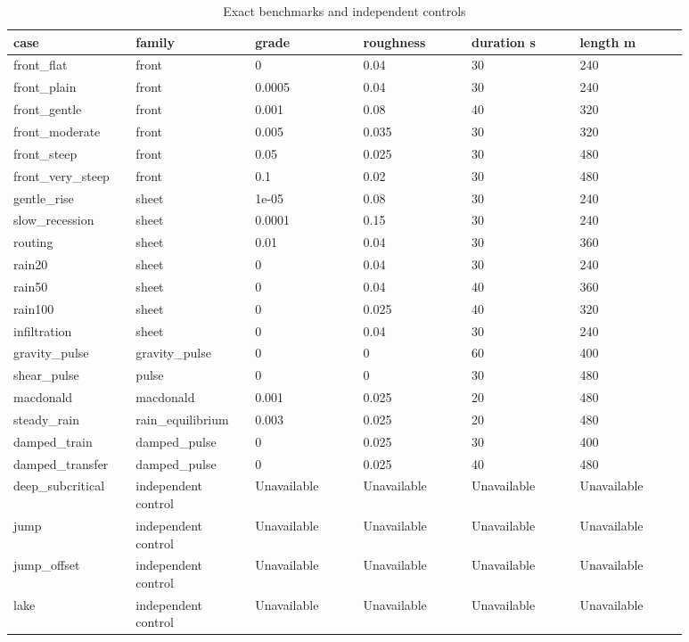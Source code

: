 \begingroup
\small
\setlength{\tabcolsep}{2pt}
\begin{longtable}{p{0.1467\linewidth}p{0.1467\linewidth}p{0.1467\linewidth}p{0.1467\linewidth}p{0.1467\linewidth}p{0.1467\linewidth}}
\caption{Exact benchmarks and independent controls}\\
\hline
case & family & grade & roughness & duration s & length m \\
\hline\endhead
front\_flat & front & 0 & 0.04 & 30 & 240 \\
front\_plain & front & 0.0005 & 0.04 & 30 & 240 \\
front\_gentle & front & 0.001 & 0.08 & 40 & 320 \\
front\_moderate & front & 0.005 & 0.035 & 30 & 320 \\
front\_steep & front & 0.05 & 0.025 & 30 & 480 \\
front\_very\_steep & front & 0.1 & 0.02 & 30 & 480 \\
gentle\_rise & sheet & 1e-05 & 0.08 & 30 & 240 \\
slow\_recession & sheet & 0.0001 & 0.15 & 30 & 240 \\
routing & sheet & 0.01 & 0.04 & 30 & 360 \\
rain20 & sheet & 0 & 0.04 & 30 & 240 \\
rain50 & sheet & 0 & 0.04 & 40 & 360 \\
rain100 & sheet & 0 & 0.025 & 40 & 320 \\
infiltration & sheet & 0 & 0.04 & 30 & 240 \\
gravity\_pulse & gravity\_pulse & 0 & 0 & 60 & 400 \\
shear\_pulse & pulse & 0 & 0 & 30 & 480 \\
macdonald & macdonald & 0.001 & 0.025 & 20 & 480 \\
steady\_rain & rain\_equilibrium & 0.003 & 0.025 & 20 & 480 \\
damped\_train & damped\_pulse & 0 & 0.025 & 30 & 400 \\
damped\_transfer & damped\_pulse & 0 & 0.025 & 40 & 480 \\
deep\_subcritical & independent control & Unavailable & Unavailable & Unavailable & Unavailable \\
jump & independent control & Unavailable & Unavailable & Unavailable & Unavailable \\
jump\_offset & independent control & Unavailable & Unavailable & Unavailable & Unavailable \\
lake & independent control & Unavailable & Unavailable & Unavailable & Unavailable \\

\end{longtable}
